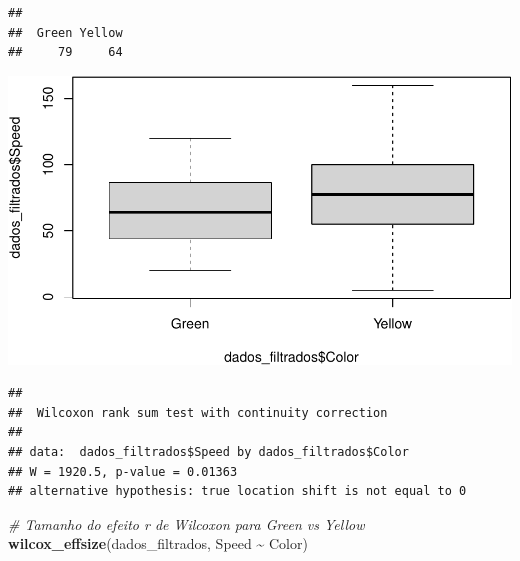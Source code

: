 \documentclass[
]{book}
\newenvironment{Shaded}{\begin{snugshade}}{\end{snugshade}}
\newcommand{\CommentTok}[1]{\textcolor[rgb]{0.56,0.35,0.01}{\textit{#1}}}
\newcommand{\FunctionTok}[1]{\textcolor[rgb]{0.13,0.29,0.53}{\textbf{#1}}}
\newcommand{\NormalTok}[1]{#1}
\newcommand{\SpecialCharTok}[1]{\textcolor[rgb]{0.81,0.36,0.00}{\textbf{#1}}}
\begin{document}
\begin{verbatim}
## 
##  Green Yellow 
##     79     64
\end{verbatim}

\begin{Shaded}
\end{Shaded}

\includegraphics{LivroEstatisticaR_files/figure-latex/rWilcoxcal-1.pdf}

\begin{Shaded}
\end{Shaded}

\begin{verbatim}
## 
##  Wilcoxon rank sum test with continuity correction
## 
## data:  dados_filtrados$Speed by dados_filtrados$Color
## W = 1920.5, p-value = 0.01363
## alternative hypothesis: true location shift is not equal to 0
\end{verbatim}

\begin{Shaded}
\begin{Highlighting}[]
\CommentTok{\# Tamanho do efeito r de Wilcoxon para Green vs Yellow}
\FunctionTok{wilcox\_effsize}\NormalTok{(dados\_filtrados, Speed }\SpecialCharTok{\textasciitilde{}}\NormalTok{ Color)}
\end{Highlighting}
\end{Shaded}
\end{document}
